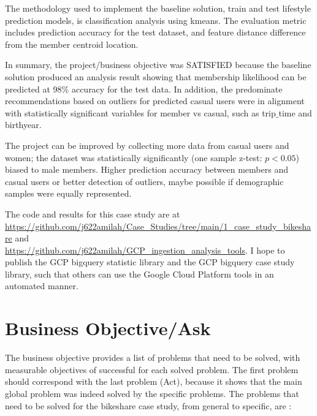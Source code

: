 \documentclass[11pt, onecolumn]{article}
\begin{document}
The methodology used to implement the baseline solution, train and test lifestyle prediction models, is classification analysis using kmeans. The evaluation metric includes prediction accuracy for the test dataset, and feature distance difference from the member centroid location.

In summary, the project/business objective was SATISFIED because the baseline solution produced an analysis result showing that membership likelihood can be predicted at 98\% accuracy for the test data. In addition, the predominate recommendations based on outliers for predicted casual users were in alignment with statistically significant variables for member vs casual, such as trip$\_$time and birthyear.  

The project can be improved by collecting more data from casual users and women; the dataset was statistically significantly (one sample z-test: $p < 0.05$) biased to male members. Higher prediction accuracy between members and casual users or better detection of outliers, maybe possible if demographic samples were equally represented.

The code and results for this case study are at 
\\
\url{https://github.com/j622amilah/Case_Studies/tree/main/1_case_study_bikeshare} and 
\\
\url{https://github.com/j622amilah/GCP_ingestion_analysis_tools}. I hope to publish the GCP bigquery statistic library and the GCP bigquery case study library, such that others can use the Google Cloud Platform tools in an automated  manner.


\section{Business Objective/Ask}

The business objective provides a list of problems that need to be solved, with measurable objectives of successful for each solved problem. The first problem should correspond with the last problem (Act), because it shows that the main global problem was indeed solved by the specific problems. The problems that need to be solved for the bikeshare case study, from general to specific, are : 
\end{document}
